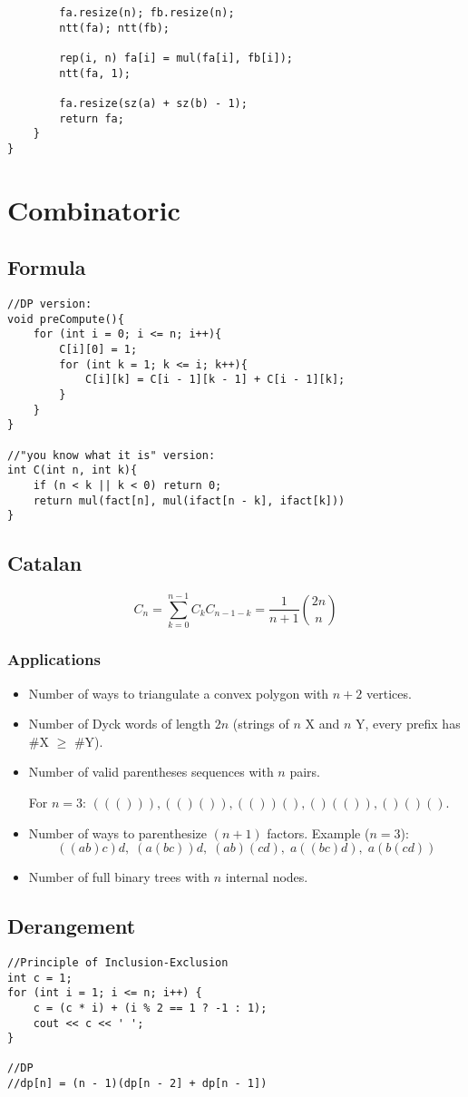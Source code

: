 \documentclass[11pt,a4paper]{article}
\begin{document}
\begin{multicols*}{2}
\begin{lstlisting}
        fa.resize(n); fb.resize(n);
        ntt(fa); ntt(fb);

        rep(i, n) fa[i] = mul(fa[i], fb[i]);
        ntt(fa, 1);

        fa.resize(sz(a) + sz(b) - 1);
        return fa;
    }
}
\end{lstlisting}

\section{Combinatoric}
\subsection{Formula}
\begin{lstlisting}
//DP version:
void preCompute(){
    for (int i = 0; i <= n; i++){
        C[i][0] = 1;
        for (int k = 1; k <= i; k++){
            C[i][k] = C[i - 1][k - 1] + C[i - 1][k];
        }
    }
}

//"you know what it is" version:
int C(int n, int k){
    if (n < k || k < 0) return 0;
    return mul(fact[n], mul(ifact[n - k], ifact[k])) 
}
\end{lstlisting}

\subsection{Catalan}
\[
C_n = \sum_{k=0}^{n-1} C_k C_{n-1-k} 
    = \frac{1}{n+1} \binom{2n}{n}
\]

\subsubsection*{Applications}
\begin{itemize}
  \item Number of ways to triangulate a convex polygon with $n+2$ vertices.
  \item Number of Dyck words of length $2n$ (strings of $n$ X and $n$ Y, every prefix has \#X $\ge$ \#Y).
  \item Number of valid parentheses sequences with $n$ pairs. 
  
  For $n=3$: \(((())), (()()), (())(), ()(()), ()()()\).
  \item Number of ways to parenthesize $(n+1)$ factors.  
        Example ($n=3$): 
        \[ ((ab)c)d,\; (a(bc))d,\; (ab)(cd),\; a((bc)d),\; a(b(cd)) \]
  \item Number of full binary trees with $n$ internal nodes.
\end{itemize}

\subsection{Derangement}
\begin{lstlisting}
//Principle of Inclusion-Exclusion
int c = 1;
for (int i = 1; i <= n; i++) {
    c = (c * i) + (i % 2 == 1 ? -1 : 1);
    cout << c << ' ';
}

//DP
//dp[n] = (n - 1)(dp[n - 2] + dp[n - 1])
\end{lstlisting}


\end{multicols*}
\end{document}
